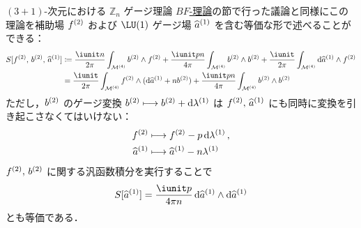 \documentclass[TQFT_main]{subfiles}
\begin{document}
\begin{myexample}[label=ex:BF-4D]{$(3+1)$-次元における $\mathbb{Z}_n$ ゲージ理論}
    \hyperref[def:BF]{$BF$-理論}の節で行った議論と同様にこの理論を補助場 $f^{(2)}$ および $\LU(1)$ ゲージ場 $\widehat{a}^{(1)}$ を含む等価な形で述べることができる：
    \begin{align}
        \label{eq:BF-4D-2}
        S [\hg{f}{2},\, \hg{b}{2},\, \hg{\widehat{a}}{1}]
        &\coloneqq \frac{\iunit n}{2\pi} \int_{\mfdcal{M}{4}} \hg{b}{2} \wedge \hg{f}{2} + \frac{\iunit  pn}{4\pi} \int_{\mfdcal{M}{4}} \hg{b}{2} \wedge \hg{b}{2} + \frac{\iunit}{2\pi} \int_{\mfdcal{M}{4}} \dd{\hg{\widehat{a}}{1}} \wedge \hg{f}{2} \\
        &= \frac{\iunit}{2\pi} \int_{\mfdcal{M}{4}} \hg{f}{2} \wedge (\dd{\hg{\widehat{a}}{1}} + n \hg{b}{2}) + \frac{\iunit pn}{4\pi} \int_{\mfdcal{M}{4}} \hg{b}{2} \wedge \hg{b}{2}
    \end{align}
    ただし，$b^{(2)}$ のゲージ変換 $b^{(2)} \longmapsto b^{(2)} + \dd{\lambda^{(1)}}$ は $f^{(2)},\, \widehat{a}^{(1)}$ にも同時に変換を引き起こさなくてはいけない：
    \begin{align}
        f^{(2)} &\longmapsto f^{(2)} - p \dd{\lambda^{(1)}}, \\
        \widehat{a}^{(1)} &\longmapsto \widehat{a}^{(1)} - n \lambda^{(1)}
    \end{align}
    $f^{(2)},\, b^{(2)}$ に関する汎函数積分を実行することで
    \begin{align}
        \label{eq:BF-4D-3}
        S [\hg{\widehat{a}}{1}] = \frac{\iunit p}{4\pi n} \dd{\hg{\widehat{a}}{1}} \wedge \dd{\hg{\widehat{a}}{1}}
    \end{align}
    とも等価である．


\end{myexample}
\end{document}
